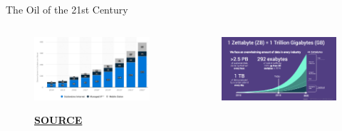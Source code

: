 \documentclass[main.tex]{subfiles}
\begin{document}
    \begin{frame}{The Oil of the 21st Century}
        \begin{columns}
            \begin{column}{.5\textwidth}
                \begin{figure}
                    \label{fig:internet-usage-1}
                    \includegraphics[width=\textwidth,cframe=gray]{figures/external/internet-usage-1.png}
                    
                    \tiny{\textbf{\href{https://de.statista.com/statistik/daten/studie/169455/umfrage/prognose-zum-weltweiten-datenvolumen-nach-segmenten/}{SOURCE}}}
                \end{figure}
            \end{column}
            \begin{column}{.5\textwidth}
                \begin{figure}
                    \label{fig:internet-usage-2}
                    \includegraphics[width=\textwidth,cframe=gray]{figures/external/internet-usage-2.png}
                    

\end{figure}
\end{column}
\end{columns}
\end{frame}
\end{document}
